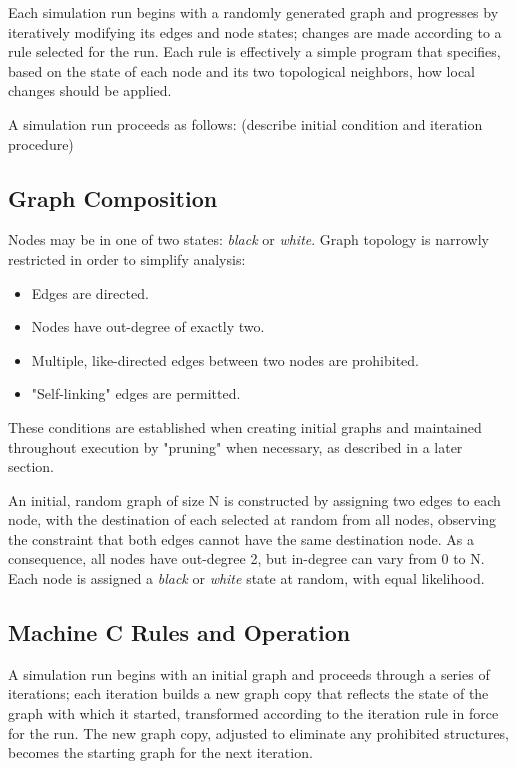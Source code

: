 \documentclass[twoside,twocolumn]{article}
\begin{document}
Each simulation run begins with a randomly generated graph and progresses by
iteratively modifying its edges and node states; changes are made according to a rule selected
for the run. Each rule is effectively a simple program  that specifies, based on the state
of each node and its two topological neighbors, how local changes should be applied.

A simulation run proceeds as follows: (describe initial condition and iteration procedure)

\subsection{Graph Composition}

Nodes may be in one of two states: \textit{black} or \textit{white}.
Graph topology is narrowly restricted in order to simplify analysis:

\begin{itemize}
    \item Edges are directed.
    \item Nodes have out-degree of exactly two.
    \item Multiple, like-directed edges between two nodes are prohibited.
    \item "Self-linking" edges are permitted.
\end{itemize}

These conditions are established when creating initial graphs and maintained
throughout execution by "pruning" when necessary, as described in a later section.

An initial, random graph of size N is constructed by assigning two edges to each node, with
the destination of each selected at random from all nodes, observing the
constraint that both edges cannot have the same destination node. As a consequence,
all nodes have out-degree 2, but in-degree can vary from 0 to N. Each node is assigned
a \textit{black} or \textit{white} state at random, with equal likelihood.

\subsection{Machine \textbf{C} Rules and Operation}

A simulation run begins with an initial graph and proceeds through a series of
iterations; each iteration builds a new graph copy that reflects the state of the graph
with which it started, transformed according to the iteration rule in force for the run.
The new graph copy, adjusted to eliminate any prohibited structures, becomes the starting
graph for the next iteration.
\end{document}
